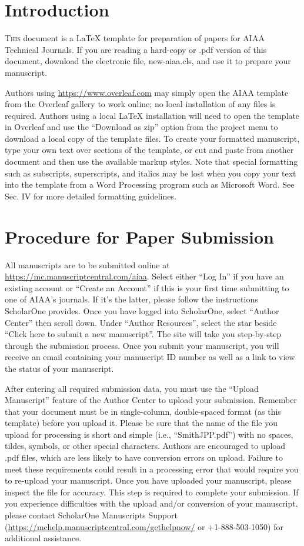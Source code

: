 \documentclass[journal]{new-aiaa}
\begin{document}
\section{Introduction}
\lettrine{T}{his} document is a \LaTeX{} template for preparation of papers for AIAA Technical Journals. If you are reading a hard-copy or .pdf version of this document, download the electronic file, new-aiaa.cls, and use it to prepare your manuscript.

Authors using \url{https://www.overleaf.com} may simply open the AIAA template from the Overleaf gallery to work online; no local installation of any files is required. Authors using a local \LaTeX{} installation will need to open the template in Overleaf and use the ``Download as zip'' option from the project menu to download a local copy of the template files. To create your formatted manuscript, type your own text over sections of the template, or cut and paste from another document and then use the available markup styles. Note that special formatting such as subscripts, superscripts, and italics may be lost when you copy your text into the template from a Word Processing program such as Microsoft Word. See Sec. IV for more detailed formatting guidelines.


\section{Procedure for Paper Submission}

All manuscripts are to be submitted online at \url{https://mc.manuscriptcentral.com/aiaa}. Select either “Log In” if you have an existing account or “Create an Account” if this is your first time submitting to one of AIAA’s journals. If it’s the latter, please follow the instructions ScholarOne provides. Once you have logged into ScholarOne, select “Author Center” then scroll down. Under “Author Resources”, select the star beside “Click here to submit a new manuscript”. The site will take you step-by-step through the submission process. Once you submit your manuscript, you will receive an email containing your manuscript ID number as well as a link to view the status of your manuscript. 

After entering all required submission data, you must use the “Upload Manuscript” feature of the Author Center to upload your submission. Remember that your document must be in single-column, double-spaced format (as this template) before you upload it. Please be sure that the name of the file you upload for processing is short and simple (i.e., “SmithJPP.pdf”) with no spaces, tildes, symbols, or other special characters. Authors are encouraged to upload .pdf files, which are less likely to have conversion errors on upload. Failure to meet these requirements could result in a processing error that would require you to re-upload your manuscript. Once you have uploaded your manuscript, please inspect the file for accuracy. This step is required to complete your submission. If you experience difficulties with the upload and/or conversion of your manuscript, please contact ScholarOne Manuscripts Support (\url{https://mchelp.manuscriptcentral.com/gethelpnow/} or +1-888-503-1050) for additional assistance. 
\end{document}
